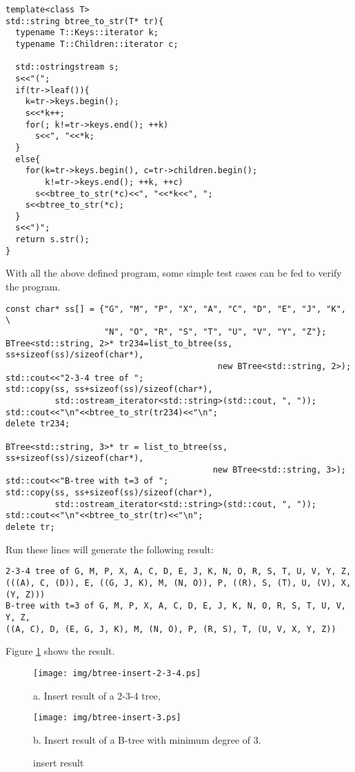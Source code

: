 \documentclass{article}
\begin{document}
\begin{lstlisting}
template<class T>
std::string btree_to_str(T* tr){
  typename T::Keys::iterator k;
  typename T::Children::iterator c;

  std::ostringstream s;
  s<<"(";
  if(tr->leaf()){
    k=tr->keys.begin();
    s<<*k++;
    for(; k!=tr->keys.end(); ++k)
      s<<", "<<*k;
  }
  else{
    for(k=tr->keys.begin(), c=tr->children.begin();
        k!=tr->keys.end(); ++k, ++c)
      s<<btree_to_str(*c)<<", "<<*k<<", ";
    s<<btree_to_str(*c);
  }
  s<<")";
  return s.str();
}
\end{lstlisting}

With all the above defined program, some simple test cases can be
fed to verify the program.

\begin{lstlisting}
const char* ss[] = {"G", "M", "P", "X", "A", "C", "D", "E", "J", "K", \
                    "N", "O", "R", "S", "T", "U", "V", "Y", "Z"};
BTree<std::string, 2>* tr234=list_to_btree(ss, ss+sizeof(ss)/sizeof(char*),
                                           new BTree<std::string, 2>);
std::cout<<"2-3-4 tree of ";
std::copy(ss, ss+sizeof(ss)/sizeof(char*),
          std::ostream_iterator<std::string>(std::cout, ", "));
std::cout<<"\n"<<btree_to_str(tr234)<<"\n";
delete tr234;

BTree<std::string, 3>* tr = list_to_btree(ss, ss+sizeof(ss)/sizeof(char*),
                                          new BTree<std::string, 3>);
std::cout<<"B-tree with t=3 of ";
std::copy(ss, ss+sizeof(ss)/sizeof(char*),
          std::ostream_iterator<std::string>(std::cout, ", "));
std::cout<<"\n"<<btree_to_str(tr)<<"\n";
delete tr;
\end{lstlisting}

Run these lines will generate the following result:

\begin{verbatim}
2-3-4 tree of G, M, P, X, A, C, D, E, J, K, N, O, R, S, T, U, V, Y, Z,
(((A), C, (D)), E, ((G, J, K), M, (N, O)), P, ((R), S, (T), U, (V), X, (Y, Z)))
B-tree with t=3 of G, M, P, X, A, C, D, E, J, K, N, O, R, S, T, U, V, Y, Z,
((A, C), D, (E, G, J, K), M, (N, O), P, (R, S), T, (U, V, X, Y, Z))
\end{verbatim}

Figure \ref{fig:btree-insert} shows the result.

\begin{figure}[htbp]
  \begin{center}
    \texttt{[image: img/btree-insert-2-3-4.ps]}

    a. Insert result of a 2-3-4 tree,

    \texttt{[image: img/btree-insert-3.ps]}

    b. Insert result of a B-tree with minimum degree of 3.
    \caption{insert result} \label{fig:btree-insert}
  \end{center}
\end{figure}
\end{document}
